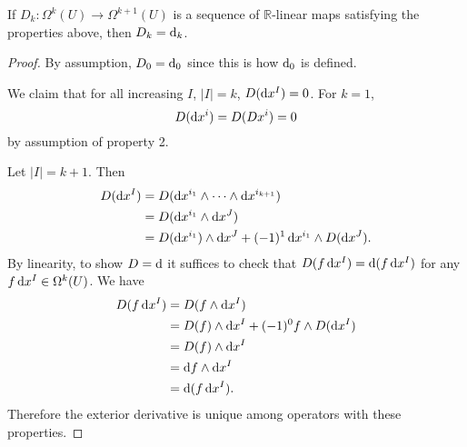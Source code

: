 \begin{prop}
If $D_k: \Omega^k(U) \to \Omega^{k+1}(U)$ is a sequence of
$\mathbb{R}$-linear maps satisfying the properties above, then
$D_k = \mathop{}\!\mathrm{d}_k$.
\end{prop}
\begin{proof}
By assumption, $D_0 = \mathop{}\!\mathrm{d}_0$ since this is how $\mathop{}\!\mathrm{d}_0$ is defined.

We claim that for all increasing $I$, $|I| = k$,
$D(\mathop{}\!\mathrm{d} x^I) = 0$. For $k = 1$,
$$
D(\mathop{}\!\mathrm{d} x^i) = D(D x^i) = 0
$$
by assumption of property 2.

Let $|I| = k + 1$. Then
\begin{align*}
   D(\dif x^I)
&= D(\dif x^{i_1} \wedge \cdots \wedge \dif x^{i_{k+1}}) \\
&= D(\dif x^{i_1} \wedge \dif x^J) \\
&= D(\dif x^{i_1}) \wedge \dif x^J
 + (-1)^1 \dif x^{i_1} \wedge D(\dif x^J).
\end{align*}
By linearity, to show $D = \mathop{}\!\mathrm{d}$ it suffices to check that
$D(f \mathop{}\!\mathrm{d} x^I) = \mathop{}\!\mathrm{d} (f \mathop{}\!\mathrm{d} x^I)$ for any
$f \mathop{}\!\mathrm{d} x^I \in \Omega^k(U)$.
We have
\begin{align*}
   D(f \dif x^I)
&= D(f \wedge \dif x^I) \\
&= D(f) \wedge \dif x^I + (-1)^0 f \wedge D(\dif x^I) \\
&= D(f) \wedge \dif x^I \\
&= \dif f \wedge \dif x^I \\
&= \dif(f \dif x^I).
\end{align*}
Therefore the exterior derivative is unique among operators with these
properties.
\end{proof}

